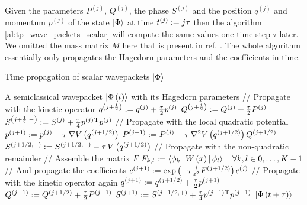Given the parameters $P^{\left(j\right)}$, $Q^{\left(j\right)}$, the phase $S^{\left(j\right)}$
and the position $q^{\left(j\right)}$ and momentum $p^{\left(j\right)}$ of the state $\Ket{\Phi}$
at time $t^{\left(j\right)} := j \tau$ then the algorithm \ref{al:tp_wave_packets_scalar}
will compute the same values one time step $\tau$ later. We omitted the mass matrix $M$ here
that is present in ref. \cite{FGL_semiclassical_dynamics}. The whole algorithm essentially
only propagates the Hagedorn parameters and the coefficients in time.

\begin{algorithm}
\caption{Time propagation of scalar wavepackets $\Ket{\Phi}$}
\label{al:tp_wave_packets_scalar}
\begin{algorithmic}
  \REQUIRE A semiclassical wavepacket $\Ket{\Phi\left( t \right)}$ with its Hagedorn parameters
  \STATE // Propagate with the kinetic operator
  \STATE $q^{\left(j+\frac{1}{2}\right)} := q^{\left(j\right)} + \frac{\tau}{2} p^{\left(j\right)}$
  \STATE $Q^{\left(j+\frac{1}{2}\right)} := Q^{\left(j\right)} + \frac{\tau}{2} P^{\left(j\right)}$
  \STATE $S^{\left(j+\frac{1}{2},-\right)} := S^{\left(j\right)} + \frac{\tau}{4} p^{\left(j\right)}{}^{\textnormal{T}} p^{\left(j\right)}$
  \STATE // Propagate with the local quadratic potential
  \STATE $p^{\left(j+1\right)} := p^{\left(j\right)} - \tau \, \nabla V\left( q^{\left(j+1/2\right)} \right)$
  \STATE $P^{\left(j+1\right)} := P^{\left(j\right)} - \tau \, \nabla^2 V\left( q^{\left(j+1/2\right)} \right) Q^{\left(j+1/2\right)}$
  \STATE $S^{\left(j+1/2,+\right)} := S^{\left(j+1/2,-\right)} - \tau \, V\left( q^{\left(j+1/2\right)} \right)$
  \STATE // Propagate with the non-quadratic remainder
  \STATE // Assemble the matrix $F$
  \STATE $F_{k,l} := \Braket{\phi_k | W\left( x \right) | \phi_l} \quad \forall k,l \in 0,\ldots,K-1$
  \STATE // And propagate the coefficients
  \STATE $c^{\left(j+1\right)} := \exp\left( -\tau \frac{i}{\varepsilon^2} F^{\left(j+1/2\right)} \right) c^{\left(j\right)}$
  \STATE // Propagate with the kinetic operator again
  \STATE $q^{\left(j+1\right)} := q^{\left(j+1/2\right)} + \frac{\tau}{2} p^{\left(j+1\right)}$
  \STATE $Q^{\left(j+1\right)} := Q^{\left(j+1/2\right)} + \frac{\tau}{2} P^{\left(j+1\right)}$
  \STATE $S^{\left(j+1\right)} := S^{\left(j+1/2,+\right)} + \frac{\tau}{4} p^{\left(j+1\right)}{}^{\textnormal{T}} p^{\left(j+1\right)}$
  \RETURN $\Ket{\Phi\left( t+\tau \right)}$
\end{algorithmic}
\end{algorithm}

